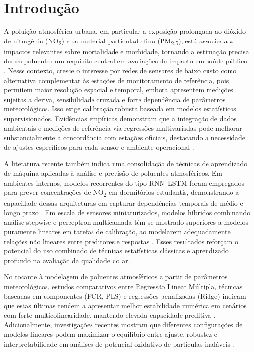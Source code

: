 \section{Introdução}
\label{sec:introducao}

A poluição atmosférica urbana, em particular a exposição prolongada ao dióxido de nitrogênio (NO\textsubscript{2}) e ao material particulado fino (PM\textsubscript{2.5}), está associada a impactos relevantes sobre mortalidade e morbidade, tornando a estimação precisa desses poluentes um requisito central em avaliações de impacto em saúde pública \cite{who_air_pollution_2022}. Nesse contexto, cresce o interesse por redes de sensores de baixo custo como alternativa complementar às estações de monitoramento de referência, pois permitem maior resolução espacial e temporal, embora apresentem medições sujeitas a deriva, sensibilidade cruzada e forte dependência de parâmetros meteorológicos. Isso exige calibração robusta baseada em modelos estatísticos supervisionados. Evidências empíricas demonstram que a integração de dados ambientais e medições de referência via regressões multivariadas pode melhorar substancialmente a concordância com estações oficiais, destacando a necessidade de ajustes específicos para cada sensor e ambiente operacional \cite{vanzoest2019}.

A literatura recente também indica uma consolidação de técnicas de aprendizado de máquina aplicadas à análise e previsão de poluentes atmosféricos. Em ambientes internos, modelos recorrentes do tipo RNN–LSTM foram empregados para prever concentrações de NO\textsubscript{2} em dormitórios estudantis, demonstrando a capacidade dessas arquiteturas em capturar dependências temporais de médio e longo prazo \cite{xie2025}. Em escala de sensores miniaturizados, modelos híbridos combinando análise stepwise e perceptron multicamada têm se mostrado superiores a modelos puramente lineares em tarefas de calibração, ao modelarem adequadamente relações não lineares entre preditores e respostas \cite{liu2021}. Esses resultados reforçam o potencial do uso combinado de técnicas estatísticas clássicas e aprendizado profundo na avaliação da qualidade do ar.

No tocante à modelagem de poluentes atmosféricos a partir de parâmetros meteorológicos, estudos comparativos entre Regressão Linear Múltipla, técnicas baseadas em componentes (PCR, PLS) e regressões penalizadas (Ridge) indicam que estas últimas tendem a apresentar melhor estabilidade numérica em cenários com forte multicolinearidade, mantendo elevada capacidade preditiva \cite{polat2021}. Adicionalmente, investigações recentes mostram que diferentes configurações de modelos lineares podem maximizar o equilíbrio entre ajuste, robustez e interpretabilidade em análises de potencial oxidativo de partículas inaláveis \cite{ngocthuy2024}.

